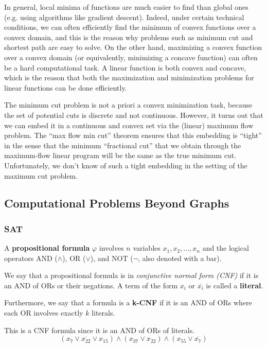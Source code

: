 \documentclass{article}
\begin{document}
  In general, local minima of functions are much easier to find than global ones (e.g. using algorithms like gradient descent). Indeed, under certain technical conditions, we can often efficiently find the minimum of convex functions over a convex domain, and this is the reason why problems such as minimum cut and shortest path are easy to solve. On the other hand, maximizing a convex function over a convex domain (or equivalently, minimizing a concave function) can often be a hard computational task. A linear function is both convex and concave, which is the reason that both the maximization and minimization problems for linear functions can be done efficiently.

  The minimum cut problem is not a priori a convex minimization task, because the set of potential cuts is discrete and not continuous. However, it turns out that we can embed it in a continuous and convex set via the (linear) maximum flow problem. The “max flow min cut” theorem ensures that this embedding is “tight” in the sense that the minimum “fractional cut” that we obtain through the maximum-flow linear program will be the same as the true minimum cut. Unfortunately, we don’t know of such a tight embedding in the setting of the maximum cut problem. 

  \subsection{Computational Problems Beyond Graphs}
  \subsubsection{SAT}
  A \textbf{propositional formula} $\varphi$ involves $n$ variables $x_1, x_2, ..., x_n$ and the logical operators AND ($\wedge$), OR ($\vee$), and NOT ($\neg$, also denoted with a bar). 

  \begin{definition}
  We say that a propositional formula is in \textit{conjunctive normal form (CNF)} if it is an AND of ORs or their negations. A term of the form $x_i$ or $\overline{x_i}$ is called a \textbf{literal}. 

  Furthermore, we say that a formula is a \textbf{k-CNF} if it is an AND of ORs where each OR involves exactly $k$ literals. 
  \end{definition}

  \begin{example}
  This is a CNF formula since it is an AND of ORs of literals. 
  \[(x_7 \vee \overline{x_{22}} \vee x_{15}) \wedge (x_{37} \vee x_{22}) \wedge (x_{55} \vee \overline{x_7})\]
  \end{example}
\end{document}
